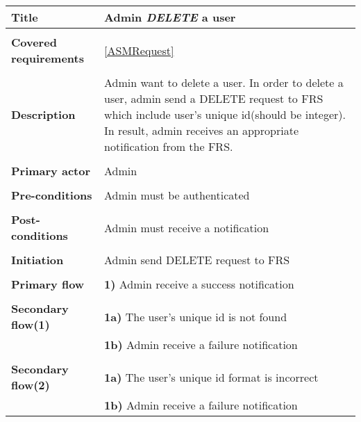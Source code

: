 \documentclass[a4paper,11pt]{article}
\begin{document}
\begin{tabular}{|p{3.5cm}|p{11.5cm}|} \hline
    \textbf{Title} &   Admin \emph{DELETE} a user
        
    \\ \hline \rowcolor{Gray} & \\ \hline
    
    \textbf{Covered requirements} &  \ref{ASMRequest}
        
    \\ \hline \rowcolor{Gray} & \\ \hline
        
    \textbf{Description} &  Admin want to delete a user. In order to delete a user, admin send a DELETE request to FRS which include user's unique id(should be integer). In result, admin receives an appropriate notification from the FRS.
        
    \\ \hline \rowcolor{Gray} & \\ \hline
        
    \textbf{Primary actor} & Admin  
        
    \\ \hline \rowcolor{Gray} & \\ \hline 
          
    \textbf{Pre-conditions} &   Admin must be authenticated
        
    \\ \hline \rowcolor{Gray} & \\ \hline
         
    \textbf{Post-conditions} &   Admin must receive a notification
        
    \\ \hline \rowcolor{Gray} & \\ \hline 
         
    \textbf{Initiation} & Admin send DELETE request to FRS
        
    \\ \hline \rowcolor{Gray} & \\ \hline 
         
    \textbf{Primary flow} & 
    \textbf{1)} Admin receive a success notification
        
    \\ \hline \rowcolor{Gray} & \\ \hline 
         
    \textbf{Secondary flow(1)} & 
    \textbf{1a)} The user's unique id is not found \\&
    \textbf{1b)} Admin receive a failure notification
     
    \\ \hline \rowcolor{Gray} & \\ \hline 
     
    \textbf{Secondary flow(2)} & 
    \textbf{1a)} The user's unique id format is incorrect \\&
    \textbf{1b)} Admin receive a failure notification
    
    \\ \hline 
\end{tabular}
\end{document}
